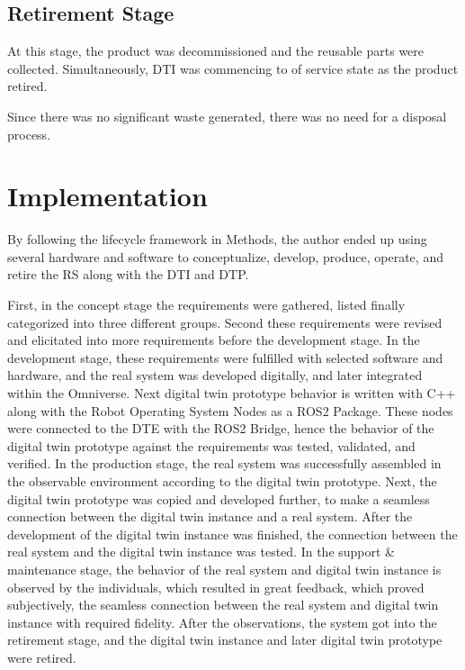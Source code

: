 \documentclass[conference]{IEEEtran}
\begin{document}
    \subsection{Retirement Stage}

    At this stage, the product was decommissioned and the reusable parts were collected. Simultaneously, DTI was commencing to of service state as the product retired.

    Since there was no significant waste generated, there was no need for a disposal process.  

    \section{Implementation}\label{section:implementation}

    By following the lifecycle framework in Methods, the author ended up using several hardware and software to conceptualize, develop, produce, operate, and retire the RS along with the DTI and DTP.

    First, in the concept stage the requirements were gathered, listed finally categorized into three different groups. Second these requirements were revised and elicitated into more requirements before the development stage. 
    In the development stage, these requirements were fulfilled with selected software and hardware, and the real system was developed digitally, and later integrated within the Omniverse. Next digital twin prototype behavior is written with C++ along with the Robot Operating System Nodes as a ROS2 Package. These nodes were connected to the DTE with the ROS2 Bridge, hence the behavior of the digital twin prototype against the requirements was tested, validated, and verified. 
    In the production stage, the real system was successfully assembled in the observable environment according to the digital twin prototype. Next, the digital twin prototype was copied and developed further,  to make a seamless connection between the digital twin instance and a real system. After the development of the digital twin instance was finished, the connection between the real system and the digital twin instance was tested. 
    In the support \& maintenance stage, the behavior of the real system and digital twin instance is observed by the individuals, which resulted in great feedback, which proved subjectively, the seamless connection between the real system and digital twin instance with required fidelity. 
    After the observations, the system got into the retirement stage, and the digital twin instance and later digital twin prototype were retired.
\end{document}
